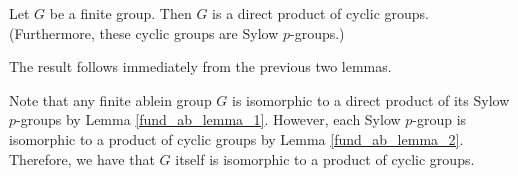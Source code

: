 \documentclass[12pt,letterpaper]{algebra_book}
\theoremstyle{definition}
\begin{document}
    \begin{thm}
        Let $G$ be a finite group. Then $G$ is a direct product of
        cyclic groups. (Furthermore, these cyclic groups are Sylow $p$-groups.)
    \end{thm}

    \begin{prf}
        The result follows immediately from the previous two lemmas. 

        Note that any finite ablein group $G$ is
        isomorphic to a direct product of its Sylow $p$-groups by Lemma \ref{fund_ab_lemma_1}. 
        However, each Sylow $p$-group is isomorphic to a product of
        cyclic groups by Lemma \ref{fund_ab_lemma_2}. Therefore, we have that $G$ itself is
        isomorphic to a product of cyclic groups. 
    \end{prf}
\end{document}
